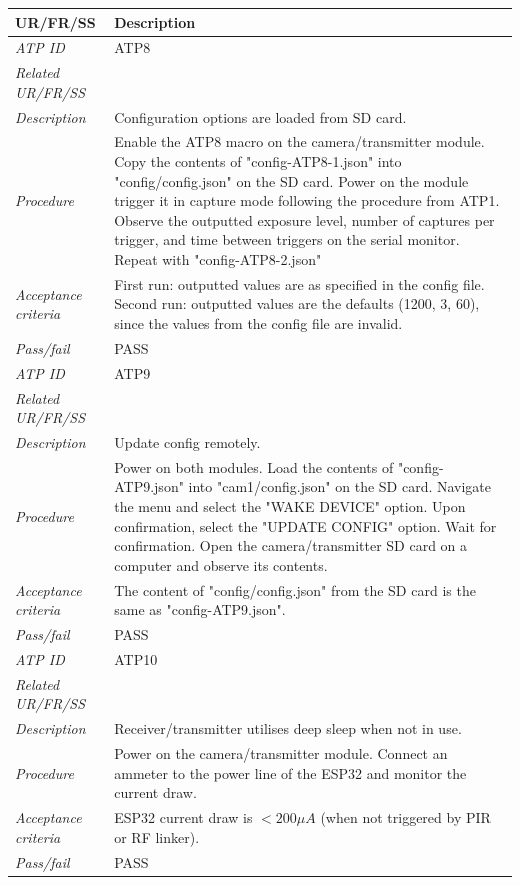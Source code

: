 \begin{table}[!ht]
    \centering
    \begin{scriptsize}
    \begin{tabularx}{\textwidth}{|p{} X|}
        
        \hline
        \textbf{UR/FR/SS} & \textbf{Description}\\ \hline

        \textit{ATP ID} & ATP8\\
        \textit{Related UR/FR/SS} & \\
        \textit{Description} & Configuration options are loaded from SD card.\\
        \textit{Procedure} & Enable the ATP8 macro on the camera/transmitter module. Copy the contents of "config-ATP8-1.json" into "config/config.json" on the SD card. Power on the module trigger it in capture mode following the procedure from ATP1. Observe the outputted exposure level, number of captures per trigger, and time between triggers on the serial monitor. Repeat with "config-ATP8-2.json" \\
        \textit{Acceptance criteria} & First run: outputted values are as specified in the config file. Second run: outputted values are the defaults (1200, 3, 60), since the values from the config file are invalid.\\ 
        \textit{Pass/fail} & PASS\\ \hline

        \textit{ATP ID} & ATP9\\
        \textit{Related UR/FR/SS} & \\
        \textit{Description} & Update config remotely.\\
        \textit{Procedure} & Power on both modules. Load the contents of "config-ATP9.json" into "cam1/config.json" on the SD card. Navigate the menu and select the "WAKE DEVICE" option. Upon confirmation, select the "UPDATE CONFIG" option. Wait for confirmation. Open the camera/transmitter SD card on a computer and observe its contents.\\
        \textit{Acceptance criteria} & The content of "config/config.json" from the SD card is the same as "config-ATP9.json".\\ 
        \textit{Pass/fail} & PASS \\ \hline

        \textit{ATP ID} & ATP10\\
        \textit{Related UR/FR/SS} & \\
        \textit{Description} & Receiver/transmitter utilises deep sleep when not in use.\\
        \textit{Procedure} & Power on the camera/transmitter module. Connect an ammeter to the power line of the ESP32 and monitor the current draw. \\
        \textit{Acceptance criteria} & ESP32 current draw is $ < 200 \mu A $ (when not triggered by PIR or RF linker).\\ 
        \textit{Pass/fail} & PASS\\ \hline


\end{tabularx}
\end{scriptsize}
\end{table}
